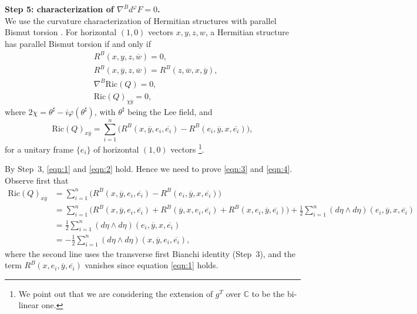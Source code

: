 \documentclass{article}
\makeatletter
\renewenvironment{proof}[1][\proofname]{%
  \par\pushQED{\qed}%
  \normalfont\topsep6\p@\@plus6\p@\relax
  \trivlist
  \item[\hskip\labelsep
        \textbf{\textup{#1}}\@addpunct{.}]\ignorespaces
}{%
  \popQED\endtrivlist\@endpefalse
}
\theoremstyle{definition}
\newcommand{\C}{\mathbb{C}}
\renewcommand{\phi}{\varphi}
\numberwithin{equation}{section}
\makeatother
\begin{document}
\begin{proof}[Proof of Theorem~\ref{thm:CKL}]
\medskip
\noindent
\textbf{Step 5: characterization of \(\nabla^B d^\phi F = 0\).}  \\
We use the curvature characterization of Hermitian structures with parallel Bismut torsion \cite{ZZ2}.  
For horizontal \((1,0)\) vectors \(x,y,z,w\), a Hermitian structure has parallel Bismut torsion if and only if
\begin{align}
& R^B(x,y,z,\overline{w}) = 0, \label{eqn:1}\\
& R^B(x,\overline{y},z,\overline{w}) = R^B(z,\overline{w},x,\overline{y}), \label{eqn:2}\\
& \nabla^B \mathrm{Ric}(Q) = 0, \label{eqn:3}\\
& \mathrm{Ric}(Q)_{\chi \overline{y}} = 0, \label{eqn:4}
\end{align}
where \(2 \chi = \theta^\sharp - i \phi(\theta^\sharp)\), with $\theta^\sharp$ being the Lee field, and
\[
\mathrm{Ric}(Q)_{x\overline{y}} = \sum_{i=1}^n \Big(R^B(x,\overline{y},e_i,\overline{e_i}) - R^B(e_i,\overline{y},x,\overline{e_i})\Big),
\]
for a unitary frame \(\{e_i\}\) of horizontal \((1,0)\) vectors \footnote{We point out that we are considering the extension of $g^T$ over $\C$ to be the bi-linear one.}.

By Step~3, \eqref{eqn:1} and \eqref{eqn:2} hold. Hence we need to prove \eqref{eqn:3} and \eqref{eqn:4}. Observe first that
\begin{equation*}
\begin{split}
\mathrm{Ric}(Q)_{x\overline{y}}
&= \sum_{i=1}^n \Big( R^B(x,\overline{y},e_i,\overline{e_i}) - R^B(e_i,\overline{y},x,\overline{e_i}) \Big)\\[2mm]
&= \sum_{i=1}^n \Big( R^B(x,\overline{y},e_i,\overline{e_i}) + R^B(\overline{y},x,e_i,\overline{e_i}) + R^B(x,e_i,\overline{y},\overline{e_i}) \Big) 
   + \tfrac{1}{2} \sum_{i=1}^n (d\eta \wedge d\eta)(e_i,\overline{y},x,\overline{e_i})\\[1mm]
&= \tfrac{1}{2} \sum_{i=1}^n (d\eta \wedge d\eta)(e_i,\overline{y},x,\overline{e_i})\\
&= -\tfrac{1}{2} \sum_{i=1}^n (d\eta \wedge d\eta)(x,\overline{y},e_i,\overline{e_i}),
\end{split}
\end{equation*}
where the second line uses the transverse first Bianchi identity (Step~3), and the term \(R^B(x,e_i,\overline{y},\overline{e_i})\) vanishes since equation \eqref{eqn:1} holds.


\end{proof}
\end{document}

